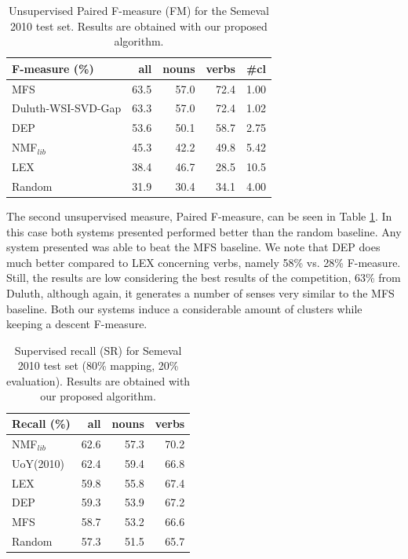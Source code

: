 \begin{table}[]
\centering
\caption{Unsupervised Paired F-measure (FM) for the Semeval 2010 test set. Results are obtained with our proposed algorithm.}
\begin{tabular}{@{}lrrrr@{}}
\toprule
\textbf{F-measure (\%)} & \textbf{all} & \textbf{nouns} & \textbf{verbs} & \textbf{\#cl} \\ \midrule
MFS & 63.5 & 57.0 & 72.4 & 1.00 \\
Duluth-WSI-SVD-Gap & 63.3 & 57.0 & 72.4 & 1.02 \\
DEP & 53.6 & 50.1 & 58.7 & 2.75 \\
NMF$_{lib}$&45.3&42.2&49.8&5.42\\
LEX & 38.4 & 46.7 & 28.5 & 10.5 \\
Random & 31.9 & 30.4 & 34.1 & 4.00 \\ \bottomrule
\end{tabular}

\label{tab:sem2010_FS}
\end{table}

The second unsupervised measure, Paired F-measure, can be seen in Table \ref{tab:sem2010_FS}. In this case both systems presented performed better than the random baseline. Any system presented was able to beat the MFS baseline. We note that DEP does much better compared to LEX concerning verbs, namely 58\% vs. 28\% F-measure. Still, the results are low considering the best results of the competition, 63\% from Duluth, although again, it generates a number of senses very similar to the MFS baseline. Both our systems induce a considerable amount of clusters while keeping a descent F-measure.



\begin{table}[tb]
\centering
\caption{Supervised recall (SR) for Semeval 2010 test set (80\% mapping, 20\% evaluation). Results are obtained with our proposed algorithm.}
\begin{tabular}{@{}lrrr@{}}
\toprule
\textbf{Recall (\%)} & \textbf{all} & \textbf{nouns} & \textbf{verbs} \\ \midrule
NMF$_{lib}$&62.6&57.3&70.2\\
UoY(2010) & 62.4 & 59.4 & 66.8 \\

LEX & 59.8 & 55.8 & 67.4 \\
DEP & 59.3 & 53.9 & 67.2 \\
MFS & 58.7 & 53.2 & 66.6 \\
Random & 57.3 & 51.5 & 65.7 \\ \bottomrule

\end{tabular}


\label{tab:sem2010_SR}
\end{table}


